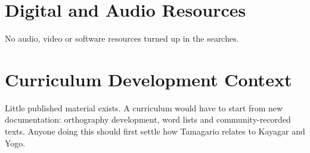 \documentclass[12pt]{article}
\begin{document}
\section{Digital and Audio Resources}
No audio, video or software resources turned up in the searches.

\section{Curriculum Development Context}
Little published material exists. A curriculum would have to start from new documentation: orthography development, word lists and community-recorded texts. Anyone doing this should first settle how Tamagario relates to Kayagar and Yogo.
\end{document}
